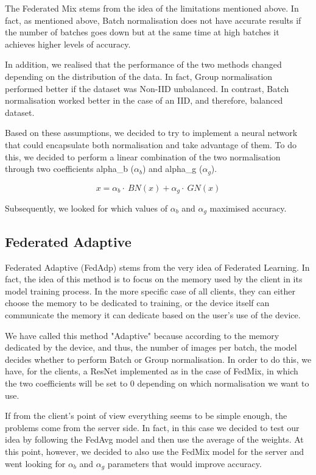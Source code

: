 \documentclass[conference]{IEEEtran}
\begin{document}
The Federated Mix stems from the idea of the limitations mentioned above. In fact, as mentioned above, Batch normalisation does not have accurate results if the number of batches goes down but at the same time at high batches it achieves higher levels of accuracy. 

In addition, we realised that the performance of the two methods changed depending on the distribution of the data. In fact, Group normalisation performed better if the dataset was Non-IID unbalanced. In contrast, Batch normalisation worked better in the case of an IID, and therefore, balanced dataset.

Based on these assumptions, we decided to try to implement a neural network that could encapsulate both normalisation and take advantage of them. To do this, we decided to perform a linear combination of the two normalisation through two coefficients alpha\_b ($\alpha_b$) and alpha\_g ($\alpha_g$). 

\begin{equation}
    x = \alpha_b \cdot~ BN(x) + \alpha_g \cdot~ GN(x)
\end{equation}

Subsequently, we looked for which values of $\alpha_b$ and $\alpha_g$ maximised accuracy.

\subsection{\textbf{Federated Adaptive}}

Federated Adaptive (FedAdp) stems from the very idea of Federated Learning. In fact, the idea of this method is to focus on the memory used by the client in its model training process. In the more specific case of all clients, they can either choose the memory to be dedicated to training, or the device itself can communicate the memory it can dedicate based on the user's use of the device. 

We have called this method "Adaptive" because according to the memory dedicated by the device, and thus, the number of images per batch, the model decides whether to perform Batch or Group normalisation. In order to do this, we have, for the clients, a ResNet implemented as in the case of FedMix, in which the two coefficients will be set to 0 depending on which normalisation we want to use.

If from the client's point of view everything seems to be simple enough, the problems come from the server side. In fact, in this case we decided to test our idea by following the FedAvg model and then use the average of the weights. At this point, however, we decided to also use the FedMix model for the server and went looking for $\alpha_b$ and $\alpha_g$ parameters that would improve accuracy.
\end{document}
